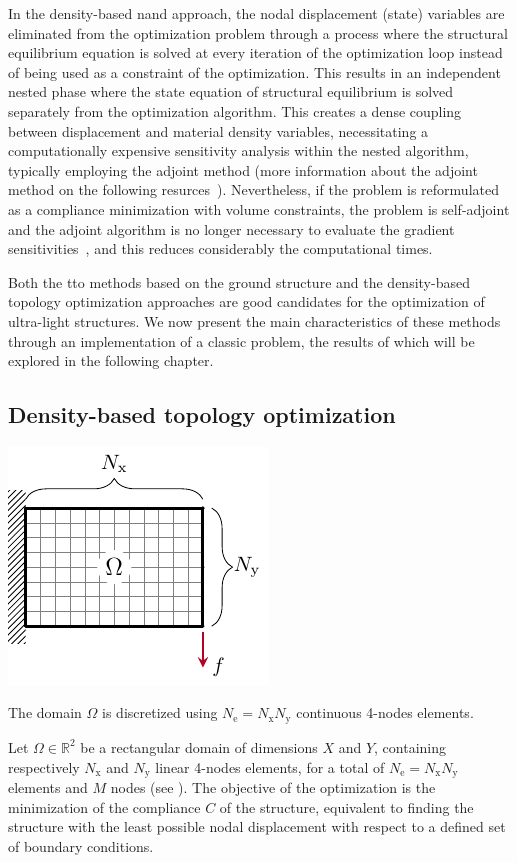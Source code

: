 In the density-based \acrfull{nand} approach, the nodal displacement (state) variables are eliminated from the optimization problem through a process where the structural equilibrium equation is solved at every iteration of the optimization loop instead of being used as a constraint of the optimization. This results in an independent nested phase where the state equation of structural equilibrium is solved separately from the optimization algorithm. This creates a dense coupling between displacement and material density variables, necessitating a computationally expensive sensitivity analysis within the nested algorithm, typically employing the adjoint method (more information about the adjoint method on the following resurces~). Nevertheless, if the problem is reformulated as a compliance minimization with volume constraints, the problem is self-adjoint and the adjoint algorithm is no longer necessary to evaluate the gradient sensitivities~, and this reduces considerably the computational times.

Both the \gls{tto} methods based on the ground structure and the density-based topology optimization approaches are good candidates for the optimization of ultra-light structures. We now present the main characteristics of these methods through an implementation of a classic problem, the results of which will be explored in the following chapter.

\subsection{Density-based topology optimization}

\begin{marginfigure}
    \centering
    \includegraphics{figures/02_literature/01_contin_mesh/c_mesh.pdf}
    \caption{The domain $\Omega$ is discretized using $N_\text{e}=N_\text{x} N_\text{y}$ continuous 4-nodes elements.}
    \label{fig:02_mesh_c}
\end{marginfigure}
Let $\Omega \in \mathbb{R}^2$ be a rectangular domain of dimensions $X$ and $Y$, containing respectively $N_\text{x}$ and $N_\text{y}$ linear 4-nodes elements, for a total of $N_\text{e}=N_\text{x} N_\text{y}$ elements and $M$ nodes (see ). The objective of the optimization is the minimization of the compliance $C$ of the structure, equivalent to finding the structure with the least possible nodal displacement with respect to a defined set of boundary conditions. 

